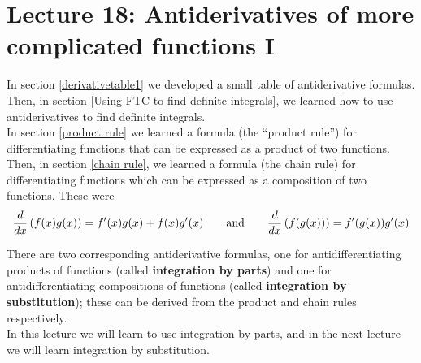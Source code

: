 \chapter{Lecture 18: Antiderivatives of more complicated functions I}
In section \ref{derivativetable1} we developed a small table of antiderivative formulas. Then, in section \ref{Using FTC to find definite integrals}, we learned how to use antiderivatives to find definite integrals.  \\

\noindent In section \ref{product rule} we learned a formula (the ``product rule'') for differentiating functions that can be expressed as a product of two functions. Then, in section \ref{chain rule}, we learned a formula (the chain rule) for differentiating functions which can be expressed as a composition of two functions. These were
\[
\frac{d}{dx}\left(f(x)g(x)\right) = f'(x)g(x) + f(x)g'(x) \qquad \text{and} \qquad \frac{d}{dx}\left(f(g(x))\right) = f'(g(x))g'(x)
\]

\noindent There are two corresponding antiderivative formulas, one for antidifferentiating products of functions (called \textbf{integration by parts}) and one for antidifferentiating compositions of functions (called \textbf{integration by substitution}); these can be derived from the product and chain rules respectively. \\

\noindent In this lecture we will learn to use integration by parts, and in the next lecture we will learn integration by substitution.

